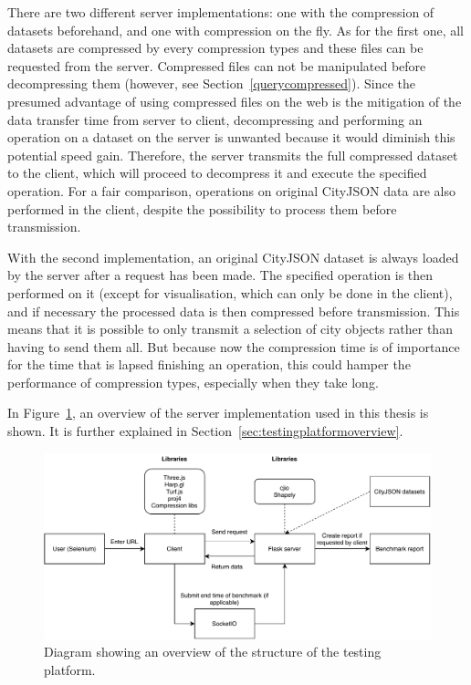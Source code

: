 There are two different server implementations: one with the compression of datasets beforehand, and one with compression on the fly.
As for the first one, all datasets are compressed by every compression types and these files can be requested from the server.
Compressed files can not be manipulated before decompressing them (however, see Section~\ref{querycompressed}).
Since the presumed advantage of using compressed files on the web is the mitigation of the data transfer time from server to client, decompressing and performing an operation on a dataset on the server is unwanted because it would diminish this potential speed gain.
Therefore, the server transmits the full compressed dataset to the client, which will proceed to decompress it and execute the specified operation.
For a fair comparison, operations on original CityJSON data are also performed in the client, despite the possibility to process them before transmission.

With the second implementation, an original CityJSON dataset is always loaded by the server after a request has been made.
The specified operation is then performed on it (except for visualisation, which can only be done in the client), and if necessary the processed data is then compressed before transmission.
This means that it is possible to only transmit a selection of city objects rather than having to send them all.
But because now the compression time is of importance for the time that is lapsed finishing an operation, this could hamper the performance of compression types, especially when they take long.

In Figure~\ref{fig:testingplatform}, an overview of the server implementation used in this thesis is shown.
It is further explained in Section~\ref{sec:testingplatformoverview}.


\begin{figure}[h!]
    \hspace*{-1.8cm}  
    \includegraphics[scale=0.95]{figs/implementation/Testing platform.pdf}
    \caption{Diagram showing an overview of the structure of the testing platform.}
    \label{fig:testingplatform}
\end{figure}



